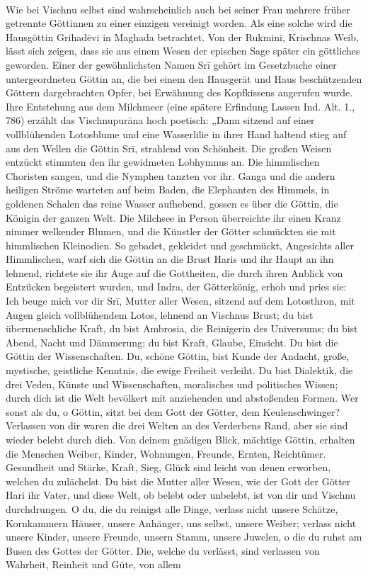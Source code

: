 \documentclass{article}
\begin{document}
\paragraph{}
Wie bei Vischnu selbst sind wahrscheinlich auch bei seiner Frau mehrere früher getrennte Göttinnen zu einer einzigen vereinigt worden. Als eine solche wird die Hausgöttin Grihad\={e}vi in Maghada betrachtet. Von der Rukmini, Krischnas Weib, lässt sich zeigen, dass sie aus einem Wesen der epischen Sage später ein göttliches geworden. Einer der gewöhnlichsten Namen Sr\={i} gehört im Gesetzbuche einer untergeordneten Göttin an, die bei einem den Hausgerät und Haus beschützenden Göttern dargebrachten Opfer, bei Erwähnung des Kopfkissens angerufen wurde. Ihre Entstehung aus dem Milchmeer (eine spätere Erfindung Lassen Ind. Alt. 1., 786) erzählt das Vischnupur\={a}na hoch poetisch: „Dann sitzend auf einer vollblühenden Lotosblume und eine Wasserlilie in ihrer Hand haltend stieg auf aus den Wellen die Göttin Sr\={i}, strahlend von Schönheit. Die großen Weisen entzückt stimmten den ihr gewidmeten Lobhymnus an. Die himmlischen Choristen sangen, und die Nymphen tanzten vor ihr. Ganga und die andern heiligen Ströme warteten auf beim Baden, die Elephanten des Himmels, in goldenen Schalen das reine Wasser aufhebend, gossen es über die Göttin, die Königin der ganzen Welt. Die Milchsee in Person überreichte ihr einen Kranz nimmer welkender Blumen, und die Künstler der Götter schmückten sie mit himmlischen Kleinodien. So gebadet, gekleidet und geschmückt, Angesichts aller Himmlischen, warf sich die Göttin an die Brust Haris und ihr Haupt an ihn lehnend, richtete sie ihr Auge auf die Gottheiten, die durch ihren Anblick von Entzücken begeistert wurden, und Indra, der Götterkönig, erhob und pries sie: Ich beuge mich vor dir Sr\={i}, Mutter aller Wesen, sitzend auf dem Lotosthron, mit Augen gleich vollblühendem Lotos, lehnend an Vischnus Brust; du bist übermenschliche Kraft, du bist Ambrosia, die Reinigerin des Universums; du bist Abend, Nacht und Dämmerung; du bist Kraft, Glaube, Einsicht. Du bist die Göttin der Wissenschaften. Du, schöne Göttin, bist Kunde der Andacht, große, mystische, geistliche Kenntnis, die ewige Freiheit verleiht. Du bist Dialektik, die drei Veden, Künste und Wissenschaften, moralisches und politisches Wissen; durch dich ist die Welt bevölkert mit anziehenden und abstoßenden Formen. Wer sonst als du, o Göttin, sitzt bei dem Gott der Götter, dem Keulenschwinger? Verlassen von dir waren die drei Welten an des Verderbens Rand, aber sie sind wieder belebt durch dich. Von deinem gnädigen Blick, mächtige Göttin, erhalten die Menschen Weiber, Kinder, Wohnungen, Freunde, Ernten, Reichtümer. Gesundheit und Stärke, Kraft, Sieg, Glück sind leicht von denen erworben, welchen du zulächelst. Du bist die Mutter aller Wesen, wie der Gott der Götter Hari ihr Vater, und diese Welt, ob belebt oder unbelebt, ist von dir und Vischnu durchdrungen. O du, die du reinigst alle Dinge, verlass nicht unsere Schätze, Kornkammern Häuser, unsere Anhänger, uns selbst, unsere Weiber; verlass nicht unsere Kinder, unsere Freunde, unsern Stamm, unsere Juwelen, o die du ruhst am Busen des Gottes der Götter. Die, welche du verlässt, sind verlassen von Wahrheit, Reinheit und Güte, von allem 
\end{document}
